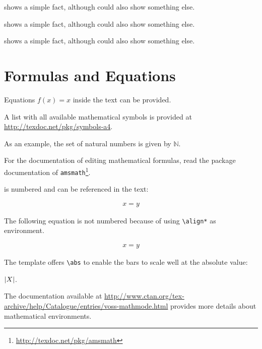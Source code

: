 \documentclass[../thesis-example-en]{subfiles}
\begin{document}
\begin{ltgexample}
 shows a simple fact, although  could also show something else.

 shows a simple fact, although  could also show something else.

 shows a simple fact, although  could also show something else.
\end{ltgexample}

\section{Formulas and Equations}

\begin{ltgexample}
Equations $f(x)=x$ inside the text can be provided.
\end{ltgexample}

A list with all available mathematical symbols is provided at \url{http://texdoc.net/pkg/symbols-a4}.

\begin{ltgexample}
As an example, the set of natural numbers is given by $\mathbb{N}$.
\end{ltgexample}

For the documentation of editing mathematical formulas, read the package documentation of \texttt{amsmath}\footnote{\url{http://texdoc.net/pkg/amsmath}}.

 is numbered and can be referenced in the text:
\begin{ltgexample}
\begin{align}
  \label{eq:test}
  x = y
\end{align}
\end{ltgexample}

The following equation is not numbered because of using \texttt{\textbackslash align*} as environment.
\begin{ltgexample}
\begin{align*}
  x = y
\end{align*}
\end{ltgexample}

The template offers \verb+\abs+ to enable the bars to scale well at the absolute value:
\begin{ltgexample}
$\left\lvert X\right\rvert$.
\end{ltgexample}

The documentation available at \url{http://www.ctan.org/tex-archive/help/Catalogue/entries/voss-mathmode.html} provides more details about mathematical environments.
\end{document}
